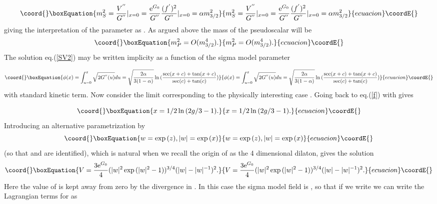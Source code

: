 \documentclass[a4paper,12pt]{article}
\begin{document}
\begin{equation}\coord{}\boxEquation{\label{ms}
m_{S}^{2} = \frac{V^{''}}{G^{''}}|_{x = 0}  =
\frac{\mathrm{e}^{G_{0}}}{G^{''}}
\frac{(f^{'})^{2}}{G^{''}}|_{x=0} = \alpha m_{3/2}^{2}
}{m_{S}^{2} = \frac{V^{''}}{G^{''}}|_{x = 0}  =
\frac{\mathrm{e}^{G_{0}}}{G^{''}}
\frac{(f^{'})^{2}}{G^{''}}|_{x=0} = \alpha m_{3/2}^{2}
}{ecuacion}\coordE{}\end{equation}
giving the interpretation of the parameter \myHighlight{$\alpha$}\coordHE{} as
\coordHE{}. As argued above the mass of the
pseudoscalar \coordHE{} will be
\begin{equation}\coord{}\boxEquation{\label{mp}
m_{P}^{2} = O(m_{3/2}^4).
}{m_{P}^{2} = O(m_{3/2}^4).
}{ecuacion}\coordE{}\end{equation}
The solution eq.(\ref{SV2}) may be written implicity as a function
of the sigma model parameter

\begin{equation}\coord{}\boxEquation{\label{phi}
    \phi(x) = \int_{u=0}^{x}\sqrt{2G^{''}(u)}du =
    \sqrt{\frac{2\alpha}{3(1-\alpha)}}\ln{(\frac{\sec(x+c)+\tan(x+c)}{\sec(c)+ \tan(c)})}
}{\phi(x) = \int_{u=0}^{x}\sqrt{2G^{''}(u)}du =
    \sqrt{\frac{2\alpha}{3(1-\alpha)}}\ln{(\frac{\sec(x+c)+\tan(x+c)}{\sec(c)+ \tan(c)})}
}{ecuacion}\coordE{}\end{equation}
with standard kinetic term. Now consider the limit \coordHE{} corresponding to the physically interesting case
\coordHE{}. Going back to eq.(\ref{f}) with \coordHE{}
gives

\begin{equation}\coord{}\boxEquation{\label{L}
   x = 1/2 \ln{(2g/3 - 1)}.
}{x = 1/2 \ln{(2g/3 - 1)}.
}{ecuacion}\coordE{}\end{equation}
Introducing an alternative parametrization by
\begin{equation}\coord{}\boxEquation{\label{w}
    w = \exp{(z)}, |w| = \exp{(x)}
}{w = \exp{(z)}, |w| = \exp{(x)}
}{ecuacion}\coordE{}\end{equation}
(so that \coordHE{} and \coordHE{} are identified), which is natural
when we recall the origin of \coordHE{} as the 4 dimensional dilaton,
gives the solution
\begin{equation}\coord{}\boxEquation{\label{SL}
    V = \frac{3 \mathrm{e}^{G_{0}}}{4}(|w|^{2} \exp{(|w|^{2}-1)})^{3/4}(|w| -
    |w|^{-1})^{2}.
}{V = \frac{3 \mathrm{e}^{G_{0}}}{4}(|w|^{2} \exp{(|w|^{2}-1)})^{3/4}(|w| -
    |w|^{-1})^{2}.
}{ecuacion}\coordE{}\end{equation}
Here the value of \coordHE{} is kept away from zero by the divergence in
\coordHE{}. In this case the sigma model field is \coordHE{}, so that if we write \coordHE{} we can write the
Lagrangian terms for \myHighlight{$\psi$}\coordHE{} as
\end{document}
